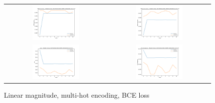 \begin{appendices}
        \begin{figure}[H]
            \centering
            \begin{tabular}{cc}
                \includegraphics[width=0.48\textwidth]{figures/training_plots/ModelC-(linear_2D)-MultiHot-BCE-ADAM_14-04-2019_13-27-14_AON-accuracy.pdf} & \includegraphics[width=0.48\textwidth]{figures/training_plots/ModelC-(linear_2D)-MultiHot-BCE-ADAM_14-04-2019_13-27-14_binary-accuracy.pdf} \\
                \includegraphics[width=0.48\textwidth]{figures/training_plots/ModelC-(linear_2D)-MultiHot-BCE-ADAM_14-04-2019_13-27-14_loss.pdf} & \includegraphics[width=0.48\textwidth]{figures/training_plots/ModelC-(linear_2D)-MultiHot-BCE-ADAM_14-04-2019_13-27-14_KL-divergence.pdf}
            \end{tabular}
            \caption*{Linear magnitude, multi-hot encoding, BCE loss}
        \end{figure}
        

\end{appendices}
